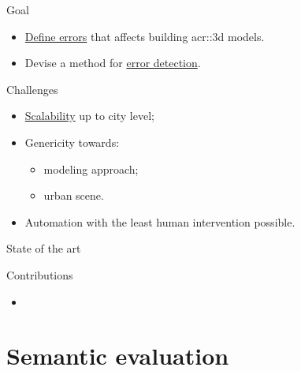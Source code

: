 \documentclass[10pt]{beamer}
\begin{document}
            \begin{frame}{Goal}
                \begin{itemize}[label=\(\blacktriangleright\), font=\color{IGNGreen}]
                    \item<1-> \underline{Define errors} that affects building \gls{acr::3d} models.
                    \item<2-> Devise a method for \underline{error detection}.
                \end{itemize}
            \end{frame}

            \begin{frame}{Challenges}
                \begin{itemize}[label=\(\blacktriangleright\), font=\color{IGNGreen}]
                    \item<1-> \underline{Scalability} up to city level;
                    \item<2-> Genericity towards:
                        \begin{itemize}
                            \item<3-> modeling approach;
                            \item<4-> urban scene.
                        \end{itemize}
                    \item<5-> Automation with the least human intervention possible.
                \end{itemize}
            \end{frame}

        \begin{frame}{State of the art}
            \centering
            
        \end{frame}

        \begin{frame}{Contributions}
            \begin{itemize}[label=\(\blacktriangleright\), font=\color{IGNGreen}, itemsep=2em]
                \item<1-> 
            \end{itemize}
        \end{frame}

    \section{Semantic evaluation}
\end{document}
